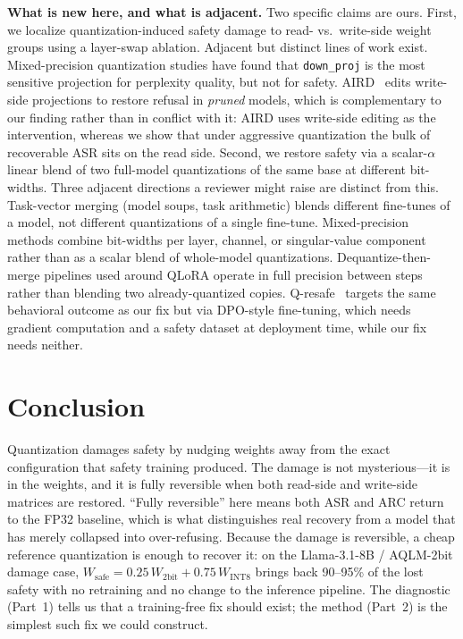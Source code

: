 \documentclass[11pt]{article}
\begin{document}
\textbf{What is new here, and what is adjacent.} Two specific claims are ours. First, we localize quantization-induced safety damage to read- vs.\ write-side weight groups using a layer-swap ablation. Adjacent but distinct lines of work exist. Mixed-precision quantization studies have found that \texttt{down\_proj} is the most sensitive projection for perplexity quality, but not for safety. AIRD~\cite{chhabra2025aird} edits write-side projections to restore refusal in \emph{pruned} models, which is complementary to our finding rather than in conflict with it: AIRD uses write-side editing as the intervention, whereas we show that under aggressive quantization the bulk of recoverable ASR sits on the read side. Second, we restore safety via a scalar-$\alpha$ linear blend of two full-model quantizations of the same base at different bit-widths. Three adjacent directions a reviewer might raise are distinct from this. Task-vector merging (model soups, task arithmetic) blends different fine-tunes of a model, not different quantizations of a single fine-tune. Mixed-precision methods combine bit-widths per layer, channel, or singular-value component rather than as a scalar blend of whole-model quantizations. Dequantize-then-merge pipelines used around QLoRA operate in full precision between steps rather than blending two already-quantized copies. Q-resafe~\cite{qresafe2025} targets the same behavioral outcome as our fix but via DPO-style fine-tuning, which needs gradient computation and a safety dataset at deployment time, while our fix needs neither.

\section{Conclusion}
\label{sec:conclusion}

Quantization damages safety by nudging weights away from the exact configuration that safety training produced. The damage is not mysterious---it is in the weights, and it is fully reversible when both read-side and write-side matrices are restored. ``Fully reversible'' here means both ASR and ARC return to the FP32 baseline, which is what distinguishes real recovery from a model that has merely collapsed into over-refusing. Because the damage is reversible, a cheap reference quantization is enough to recover it: on the Llama-3.1-8B / AQLM-2bit damage case, $W_{\text{safe}} = 0.25\, W_{\text{2bit}} + 0.75\, W_{\text{INT8}}$ brings back 90--95\% of the lost safety with no retraining and no change to the inference pipeline. The diagnostic (Part~1) tells us that a training-free fix should exist; the method (Part~2) is the simplest such fix we could construct.
\end{document}
